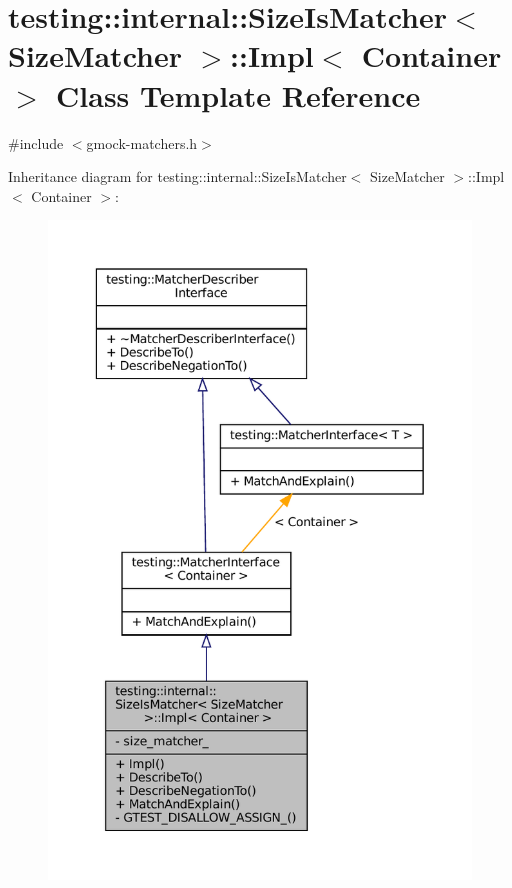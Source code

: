 \hypertarget{classtesting_1_1internal_1_1SizeIsMatcher_1_1Impl}{}\section{testing\+:\+:internal\+:\+:Size\+Is\+Matcher$<$ Size\+Matcher $>$\+:\+:Impl$<$ Container $>$ Class Template Reference}
\label{classtesting_1_1internal_1_1SizeIsMatcher_1_1Impl}


{\ttfamily \#include $<$gmock-\/matchers.\+h$>$}



Inheritance diagram for testing\+:\+:internal\+:\+:Size\+Is\+Matcher$<$ Size\+Matcher $>$\+:\+:Impl$<$ Container $>$\+:
\nopagebreak
\begin{figure}[H]
\begin{center}
\leavevmode
\includegraphics[width=349pt]{classtesting_1_1internal_1_1SizeIsMatcher_1_1Impl__inherit__graph}
\end{center}
\end{figure}


